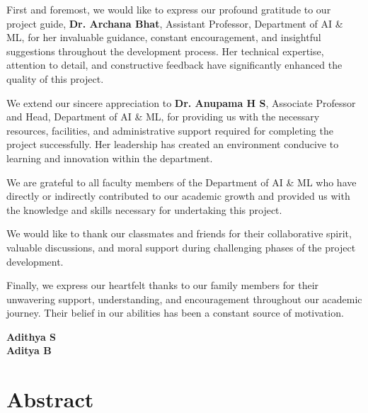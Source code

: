 \documentclass[12pt,a4paper]{report}
\begin{document}
First and foremost, we would like to express our profound gratitude to our project guide, \textbf{Dr. Archana Bhat}, Assistant Professor, Department of AI \& ML, for her invaluable guidance, constant encouragement, and insightful suggestions throughout the development process. Her technical expertise, attention to detail, and constructive feedback have significantly enhanced the quality of this project.

\vspace{0.5cm}

We extend our sincere appreciation to \textbf{Dr. Anupama H S}, Associate Professor and Head, Department of AI \& ML, for providing us with the necessary resources, facilities, and administrative support required for completing the project successfully. Her leadership has created an environment conducive to learning and innovation within the department.

\vspace{0.5cm}

We are grateful to all faculty members of the Department of AI \& ML who have directly or indirectly contributed to our academic growth and provided us with the knowledge and skills necessary for undertaking this project.

\vspace{0.5cm}

We would like to thank our classmates and friends for their collaborative spirit, valuable discussions, and moral support during challenging phases of the project development.

\vspace{0.5cm}

Finally, we express our heartfelt thanks to our family members for their unwavering support, understanding, and encouragement throughout our academic journey. Their belief in our abilities has been a constant source of motivation.

\vspace{2cm}

\begin{flushright}
\textbf{Adithya S}\\
\textbf{Aditya B}
\end{flushright}

\cleardoublepage
\chapter*{Abstract}
\thispagestyle{empty}
\end{document}
